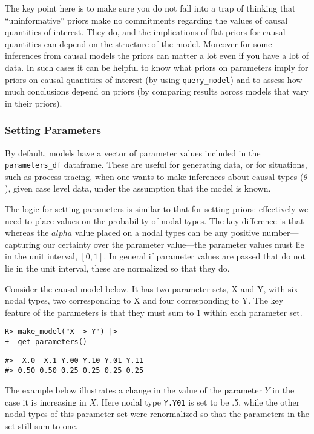 \documentclass[
  11pt,
  article]{jss}
\begin{document}
The key point here is to make sure you do not fall into a trap of
thinking that ``uninformative'' priors make no commitments regarding the
values of causal quantities of interest. They do, and the implications
of flat priors for causal quantities can depend on the structure of the
model. Moreover for some inferences from causal models the priors can
matter a lot even if you have a lot of data. In such cases it can be
helpful to know what priors on parameters imply for priors on causal
quantities of interest (by using \texttt{query\_model}) and to assess
how much conclusions depend on priors (by comparing results across
models that vary in their priors).

\hypertarget{parameters}{%
\subsubsection{Setting Parameters}\label{parameters}}

By default, models have a vector of parameter values included in the
\texttt{parameters\_df} dataframe. These are useful for generating data,
or for situations, such as process tracing, when one wants to make
inferences about causal types (\(\theta\)), given case level data, under
the assumption that the model is known.

The logic for setting parameters is similar to that for setting priors:
effectively we need to place values on the probability of nodal types.
The key difference is that whereas the \(alpha\) value placed on a nodal
types can be any positive number---capturing our certainty over the
parameter value---the parameter values must lie in the unit interval,
\([0,1]\). In general if parameter values are passed that do not lie in
the unit interval, these are normalized so that they do.

Consider the causal model below. It has two parameter sets, X and Y,
with six nodal types, two corresponding to X and four corresponding to
Y. The key feature of the parameters is that they must sum to 1 within
each parameter set.

\begin{verbatim}
R> make_model("X -> Y") |> 
+  get_parameters()
\end{verbatim}

\begin{verbatim}
#>  X.0  X.1 Y.00 Y.10 Y.01 Y.11 
#> 0.50 0.50 0.25 0.25 0.25 0.25
\end{verbatim}

The example below illustrates a change in the value of the parameter
\(Y\) in the case it is increasing in \(X\). Here nodal type
\texttt{Y.Y01} is set to be .5, while the other nodal types of this
parameter set were renormalized so that the parameters in the set still
sum to one.
\end{document}
